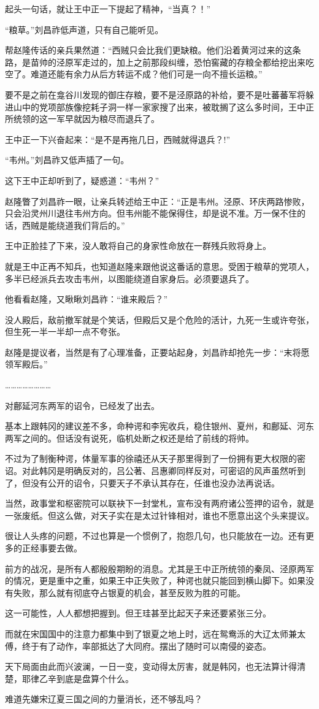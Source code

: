 起头一句话，就让王中正一下提起了精神，“当真？！”

“粮草。”刘昌祚低声道，只有自己能听见。

帮赵隆传话的亲兵果然道：“西贼只会比我们更缺粮。他们沿着黄河过来的这条路，是苗帅的泾原军走过的，加上之前那段纠缠，恐怕窖藏的存粮全都给挖出来吃空了。难道还能有余力从后方转运不成？他们可是一向不擅长运粮。”

要不是之前在龛谷川发现的御庄存粮，要不是泾原路的补给，要不是吐蕃蕃军将躲进山中的党项部族像挖耗子洞一样一家家搜了出来，被耽搁了这么多时间，王中正所统领的这一军早就因为粮尽而退兵了。

王中正一下兴奋起来：“是不是再拖几日，西贼就得退兵？!”

“韦州。”刘昌祚又低声插了一句。

这下王中正却听到了，疑惑道：“韦州？”

赵隆瞥了刘昌祚一眼，让亲兵转述给王中正：“正是韦州。泾原、环庆两路惨败，只会沿灵州川退往韦州方向。但韦州能不能保得住，却是说不准。万一保不住的话，西贼是能绕道我们背后的。”

王中正脸挂了下来，没人敢将自己的身家性命放在一群残兵败将身上。

就是王中正再不知兵，也知道赵隆来跟他说这番话的意思。受困于粮草的党项人，多半已经派兵去攻击韦州，以图能绕道自家身后。必须要退兵了。

他看看赵隆，又瞅瞅刘昌祚：“谁来殿后？”

没人殿后，敌前撤军就是个笑话，但殿后又是个危险的活计，九死一生或许夸张，但生死一半一半却一点不夸张。

赵隆是提议者，当然是有了心理准备，正要站起身，刘昌祚却抢先一步：“末将愿领军殿后。”

……………………

对鄜延河东两军的诏令，已经发了出去。

基本上跟韩冈的建议差不多，命种谔和李宪收兵，稳住银州、夏州，和鄜延、河东两军之间的。但话没有说死，临机处断之权还是给了前线的将帅。

不过为了制衡种谔，体量军事的徐禧还从天子那里得到了一份拥有更大权限的密诏。对此韩冈是明确反对的，吕公著、吕惠卿同样反对，可密诏的风声虽然听到了，但没有公开的诏令，只要天子不承认其存在，任谁也没办法再说话。

当然，政事堂和枢密院可以联袂下一封堂札，宣布没有两府诸公签押的诏令，就是一张废纸。但这么做，对天子实在是太过针锋相对，谁也不愿意出这个头来提议。

很让人头疼的问题，不过也算是一个惯例了，抱怨几句，也只能放在一边。还有更多的正经事要去做。

前方的战况，是所有人都殷殷期盼的消息。尤其是王中正所统领的秦凤、泾原两军的情况，更是重中之重，如果王中正失败了，种谔也就只能回到横山脚下。如果没有失败，那么就有彻底夺占银夏的机会，甚至反败为胜的可能。

这一可能性，人人都想把握到。但王珪甚至比起天子来还要紧张三分。

而就在宋国国中的注意力都集中到了银夏之地上时，远在鸳鸯泺的大辽太师兼太傅，终于有了动作，率部抵达了大同府。摆出了随时可以南侵的姿态。

天下局面由此而兴波澜，一日一变，变动得太厉害，就是韩冈，也无法算计得清楚，耶律乙辛到底是盘算个什么。

难道先嫌宋辽夏三国之间的力量消长，还不够乱吗？

